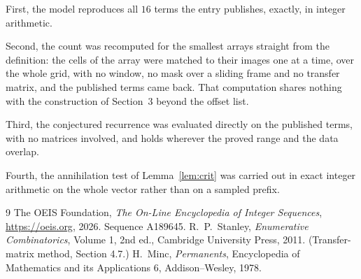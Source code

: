 \documentclass[11pt,a4paper]{article}
\theoremstyle{plain}
\theoremstyle{definition}
\begin{document}
First, the model reproduces all $16$ terms the entry publishes, exactly, in integer
arithmetic.

Second, the count was recomputed for the smallest arrays straight from the definition: the
cells of the array were matched to their images one at a time, over the whole grid, with no
window, no mask over a sliding frame and no transfer matrix, and the published terms came back.
That computation shares nothing with the construction of Section~3 beyond the offset list.

Third, the conjectured recurrence was evaluated directly on the published terms, with no
matrices involved, and holds wherever the proved range and the data overlap.

Fourth, the annihilation test of Lemma~\ref{lem:crit} was carried out in exact integer
arithmetic on the whole vector rather than on a sampled prefix.

\begin{thebibliography}{9}
 The OEIS Foundation, \emph{The On-Line Encyclopedia of Integer
Sequences}, \url{https://oeis.org}, 2026. Sequence A189645.
 R.~P.~Stanley, \emph{Enumerative Combinatorics}, Volume 1, 2nd ed.,
Cambridge University Press, 2011. (Transfer-matrix method, Section 4.7.)
 H.~Minc, \emph{Permanents}, Encyclopedia of Mathematics and its
Applications 6, Addison--Wesley, 1978.
\end{thebibliography}
\end{document}
